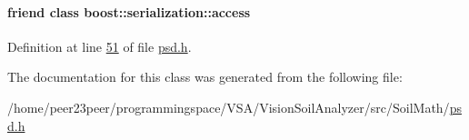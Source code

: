 \paragraph[{boost\+::serialization\+::access}]{\setlength{\rightskip}{0pt plus 5cm}friend class boost\+::serialization\+::access\hspace{0.3cm}{\ttfamily [friend]}}\label{class_soil_math_1_1_p_s_d_ac98d07dd8f7b70e16ccb9a01abf56b9c}


Definition at line \hyperlink{psd_8h_source_l00051}{51} of file \hyperlink{psd_8h_source}{psd.\+h}.



The documentation for this class was generated from the following file\+:\begin{DoxyCompactItemize}
\item 
/home/peer23peer/programmingspace/\+V\+S\+A/\+Vision\+Soil\+Analyzer/src/\+Soil\+Math/\hyperlink{psd_8h}{psd.\+h}\end{DoxyCompactItemize}
